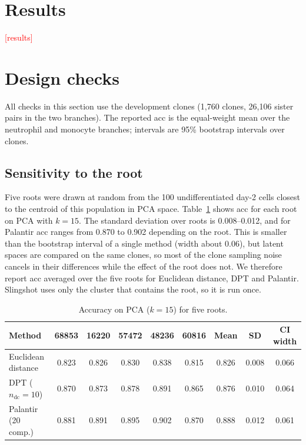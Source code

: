 \documentclass[12pt,a4paper]{article}
\newcommand{\todo}[1]{\textcolor{red}{[#1]}}
\begin{document}
\section{Results}

\todo{results}




\appendix
\renewcommand{\thetable}{S\arabic{table}}
\renewcommand{\thefigure}{S\arabic{figure}}
\setcounter{table}{0}
\setcounter{figure}{0}

\section{Design checks}
All checks in this section use the development clones (1{,}760 clones, 26{,}106 sister pairs in
the two branches). The reported acc is the equal-weight mean over the neutrophil and monocyte
branches; intervals are 95\% bootstrap intervals over clones.

\subsection{Sensitivity to the root}
Five roots were drawn at random from the 100 undifferentiated day-2 cells closest to the centroid
of this population in PCA space. Table~\ref{tab:roots} shows acc for each root on PCA with
$k=15$. The standard deviation over roots is 0.008--0.012, and for Palantir acc ranges from 0.870
to 0.902 depending on the root. This is smaller than the bootstrap interval of a single method
(width about 0.06), but latent spaces are compared on the same clones, so most of the clone
sampling noise cancels in their differences while the effect of the root does not. We therefore
report acc averaged over the five roots for Euclidean distance, DPT and Palantir. Slingshot uses
only the cluster that contains the root, so it is run once.

\begin{table}[ht]
\centering\small
\caption{Accuracy on PCA ($k=15$) for five roots.}
\label{tab:roots}
\setlength{\tabcolsep}{3.5pt}
\begin{tabular}{lcccccccc}
\toprule
Method & 68853 & 16220 & 57472 & 48236 & 60816 & Mean & SD & CI width \\
\midrule
Euclidean distance       & 0.823 & 0.826 & 0.830 & 0.838 & 0.815 & 0.826 & 0.008 & 0.066 \\
DPT ($n_{\mathrm{dc}}=10$) & 0.870 & 0.873 & 0.878 & 0.891 & 0.865 & 0.876 & 0.010 & 0.064 \\
Palantir (20 comp.)      & 0.881 & 0.891 & 0.895 & 0.902 & 0.870 & 0.888 & 0.012 & 0.061 \\
\bottomrule
\end{tabular}
\end{table}
\end{document}
